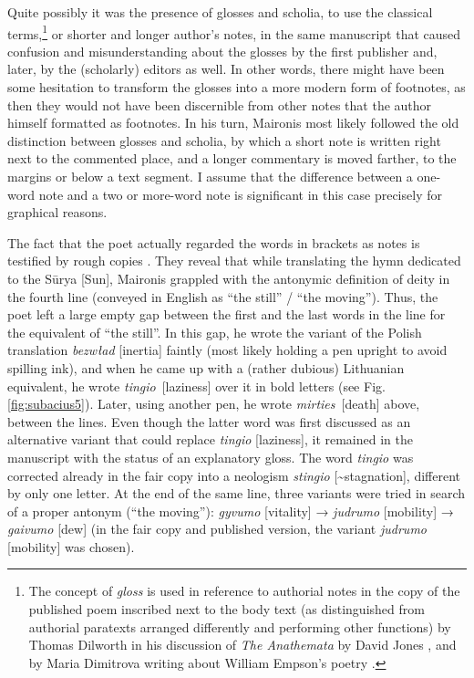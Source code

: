 \begin{paper}
Quite possibly it was the presence of glosses and scholia, to use
the classical terms,\footnote{The concept of \emph{gloss} is used in
  reference to authorial notes in the copy of the published poem
  inscribed next to the body text (as distinguished from authorial
  paratexts arranged differently and performing other functions) by
  Thomas Dilworth in his discussion of \emph{The Anathemata} by David
  Jones \citep{dilworth_david_1980}, and by Maria Dimitrova writing about William
  Empson's poetry \citep{dimitrova_decorus_2012}.} or shorter and longer author's
notes, in the same manuscript that caused confusion and misunderstanding
about the glosses by the first publisher and, later, by the (scholarly) editors
as well. In other words, there might have been some hesitation to
transform the glosses into a more modern form of footnotes, as then they
would not have been discernible from other notes that the author himself formatted as footnotes. In his turn, Maironis most likely followed the old
distinction between glosses and scholia, by which a short note is
written right next to the commented place, and a longer commentary is
moved farther, to the margins or below a text segment. I assume that the
difference between a one-word note and a two or more-word note is
significant in this case precisely for graphical reasons.

The fact that the poet actually regarded the words in brackets as notes
is testified by rough copies \citep[6v and 9v]{maironis_daiktu_1922}. They reveal
that while translating the hymn dedicated to the Sūrya {[}Sun{]},
Maironis grappled with the antonymic definition of deity in the fourth
line (conveyed in English as ``the still'' / ``the moving''). Thus, the
poet left a large empty gap between the first and the last words in the
line for the equivalent of ``the still''. In this gap, he wrote the
variant of the Polish translation \emph{bezwład} {[}inertia{]} faintly
(most likely holding a pen upright to avoid spilling ink), and when he
came up with a (rather dubious) Lithuanian equivalent, he wrote
\emph{tingio}~{[}laziness{]} over it in bold letters (see Fig. \ref{fig:subacius5}).
Later, using another pen, he wrote \emph{mirties}~{[}death{]} above,
between the lines. Even though the latter word was first discussed as an
alternative variant that could replace \emph{tingio} {[}laziness{]}, it
remained in the manuscript with the status of an explanatory gloss. The
word \emph{tingio} was corrected already in the fair copy into a
neologism \emph{stingio} {[}\textasciitilde stagnation{]}, different by
only one letter. At the end of the same line, three variants were tried
in search of a proper antonym (``the moving''): \emph{gyvumo}
{[}vitality{]} → \emph{judrumo} {[}mobility{]} → \emph{gaivumo}
{[}dew{]} (in the fair copy and published version, the variant
\emph{judrumo} {[}mobility{]} was chosen).


\end{paper}
